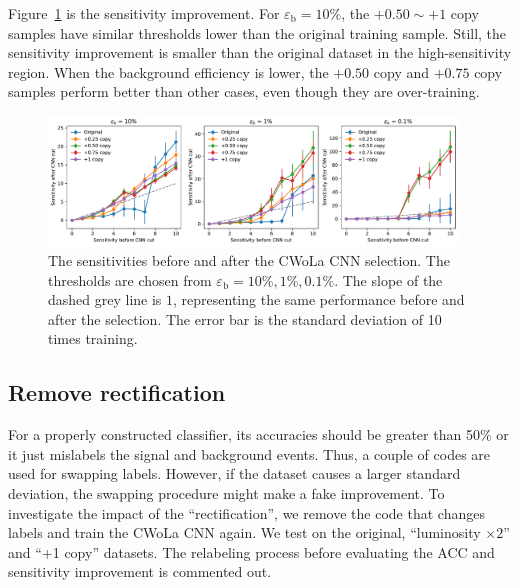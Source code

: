 \documentclass[12pt]{article}
\begin{document}
        Figure~\ref{fig:sensitivity_improvement_bkg_eff_copy_ratio} is the sensitivity improvement. For $\varepsilon_{\text{b}} = 10\%$, the $+0.50 \sim +1$ copy samples have similar thresholds lower than the original training sample. Still, the sensitivity improvement is smaller than the original dataset in the high-sensitivity region. When the background efficiency is lower, the $+ 0.50$ copy and $+ 0.75$ copy samples perform better than other cases, even though they are over-training. 
        \begin{figure}[htpb]
            \centering
            \includegraphics[width=0.97\textwidth]{HVmodel_sensitivity_improvement_bkg_eff_copy_ratio.pdf}
            \caption{The sensitivities before and after the CWoLa CNN selection. The thresholds are chosen from $\varepsilon_{\text{b}} = 10\%, 1\%, 0.1\%$. The slope of the dashed grey line is $1$, representing the same performance before and after the selection. The error bar is the standard deviation of 10 times training.}
            \label{fig:sensitivity_improvement_bkg_eff_copy_ratio}
        \end{figure}
    \subsection{Remove rectification}%
    \label{sub:remove_rectification}
        For a properly constructed classifier, its accuracies should be greater than 50\% or it just mislabels the signal and background events.    Thus, a couple of codes are used for swapping labels. However, if the dataset causes a larger standard deviation, the swapping procedure might make a fake improvement. To investigate the impact of the ``rectification'', we remove the code that changes labels and train the CWoLa CNN again. We test on the original, ``luminosity $\times 2$'' and ``+1 copy'' datasets. The relabeling process before evaluating the ACC and sensitivity improvement is commented out.
\end{document}
